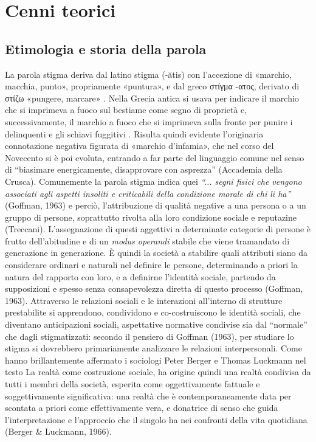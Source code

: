 \chapter{Cenni teorici}

\section{Etimologia e storia della parola}

La parola stigma deriva dal latino stigma (-ătis) con l’accezione di «marchio, macchia, punto», propriamente «puntura», e dal greco \textgreek{στίγμα -ατος}, derivato di \textgreek{στίζω} «pungere, marcare» \autocite{treccani-stigma}.
Nella Grecia antica si usava per indicare il marchio che si imprimeva a fuoco sul bestiame come segno di proprietà e, successivamente, il marchio a fuoco che si imprimeva sulla fronte per punire i delinquenti e gli schiavi fuggitivi \autocite{garzanti-linguistica-stigma}.
Risulta quindi evidente l’originaria connotazione negativa figurata di «marchio d’infamia», che nel corso del Novecento si è poi evoluta, entrando a far parte del linguaggio comune nel senso di “biasimare energicamente, disapprovare con asprezza” (Accademia della Crusca).
Comunemente la parola stigma indica quei \textit{“... segni fisici che vengono associati agli aspetti insoliti e criticabili della condizione morale di chi li ha”} (Goffman, 1963) e perciò, l’attribuzione di qualità negative a una persona o a un gruppo di persone, soprattutto rivolta alla loro condizione sociale e reputazine (Treccani).
L’assegnazione di questi aggettivi a determinate categorie di persone è frutto dell’abitudine e di un \textit{modus operandi} stabile che viene tramandato di generazione in generazione.
È quindi la società a stabilire quali attributi siano da considerare ordinari e naturali nel definire le persone, determinando a priori la natura del rapporto con loro, e a definirne l’identità sociale, partendo da supposizioni e spesso senza consapevolezza diretta di questo processo (Goffman, 1963).
Attraverso le relazioni sociali e le interazioni all'interno di strutture prestabilite si apprendono, condividono e co-costruiscono le identità sociali, che diventano anticipazioni sociali, aspettative normative condivise sia dal “normale” che dagli stigmatizzati: secondo il pensiero di Goffman (1963), per studiare lo stigma si dovrebbero primariamente analizzare le relazioni interpersonali. Come hanno brillantemente affermato i sociologi Peter Berger e Thomas Luckmann nel testo La realtà come costruzione sociale, ha origine quindi una realtà condivisa da tutti i membri della società, esperita come oggettivamente fattuale e soggettivamente significativa: una realtà che è contemporaneamente data per scontata a priori come effettivamente vera, e donatrice di senso che guida l’interpretazione e l’approccio che il singolo ha nei confronti della vita quotidiana (Berger \& Luckmann, 1966).
